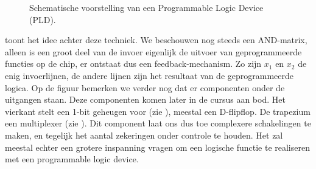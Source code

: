 \begin{figure}[hbt]
\caption{Schematische voorstelling van een Programmable Logic Device (PLD).}
\end{figure}

toont het idee achter deze techniek. We beschouwen nog steeds een AND-matrix, alleen is een groot deel van de invoer eigenlijk de uitvoer van geprogrammeerde functies op de chip, er ontstaat dus een feedback-mechanism. Zo zijn $x_1$ en $x_2$ de enig invoerlijnen, de andere lijnen zijn het resultaat van de geprogrammeerde logica. Op de figuur bemerken we verder nog dat er componenten onder de uitgangen staan. Deze componenten komen later in de cursus aan bod. Het vierkant stelt een 1-bit geheugen voor (zie ), meestal een D-flipflop. De trapezium een multiplexer (zie ). Dit component laat ons dus toe complexere schakelingen te maken, en tegelijk het aantal zekeringen onder controle te houden. Het zal meestal echter een grotere inspanning vragen om een logische functie te realiseren met een programmable logic device.

